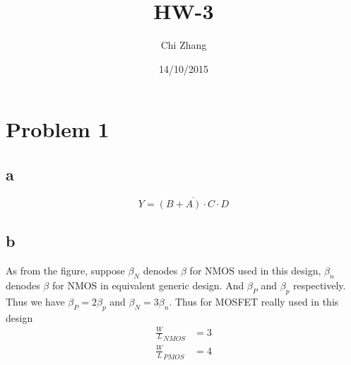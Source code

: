 \documentclass[a4paper,10pt]{article}
\title{HW-3}
\author{Chi Zhang}
\date{14/10/2015}
\begin{document}
\maketitle
\section*{Problem 1}
\subsection*{a}
\begin{equation}
 Y=\overline{(B+A)\cdot C\cdot D}
\end{equation}
\subsection*{b}
As from the figure, suppose \begin{math}\beta_N\end{math} denodes \begin{math}\beta\end{math} for NMOS used in this design, 
\begin{math}\beta_n\end{math} denodes \begin{math}\beta\end{math} for NMOS in equivalent generic design. And 
\begin{math}\beta_P\end{math} and \begin{math}\beta_p\end{math} respectively.\\
Thus we have \begin{math}\beta_P = 2\beta_p\end{math} and \begin{math}\beta_N = 3\beta_n\end{math}. Thus for MOSFET really used
in this design
\begin{equation}
\begin{split}
 \frac{W}{L}_{NMOS} &= 3\\
 \frac{W}{L}_{PMOS} &= 4
\end{split}
\end{equation}
\end{document}
